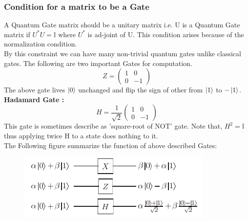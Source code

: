\documentclass[11 pt]{article}
\theoremstyle{definition}
\theoremstyle{remark}
\begin{document}
\subsubsection{Condition for a matrix to be a Gate}
A Quantum Gate matrix should be a unitary matrix i.e. U is a Quantum Gate matrix if $U^*U = \mathbb{I}$ where $U^*$ is ad-joint of U. This condition arises because of the normalization condition.\\ 
By this constraint we can have many non-trivial quantum gates unlike classical gates. The following are two important Gates for computation.
$$Z = \begin{pmatrix}
           1 & 0\\
           0 & -1
\end{pmatrix}$$
The above gate lives $\ket{0}$ unchanged and flip the sign of other from $\ket{1}$ to $-\ket{1}$.\\
\textbf{Hadamard Gate :}
$$H = \dfrac{1}{\sqrt{2}}\begin{pmatrix}
           1 & 0\\
           0 & -1
\end{pmatrix}$$
This gate is sometimes describe as 'square-root of NOT' gate. Note that, $H^2 = \mathbb{I}$  thus applying twice H to a state does nothing to it.\\
The Following figure summarize the function of above described Gates:
\begin{figure}[htp]
    \centering
    \includegraphics{Gates.png}
\end{figure}
\end{document}
